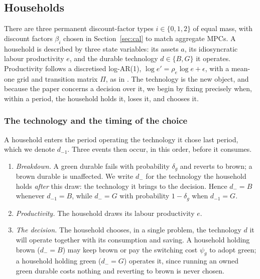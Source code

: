 \subsection{Households}\label{sec:hh}

There are three permanent discount-factor types $i\in\{0,1,2\}$ of equal mass, with
discount factors $\beta_i$ chosen in Section~\ref{sec:cal} to match aggregate MPCs.
A household is described by three state variables: its assets $a$, its idiosyncratic
labour productivity $e$, and the durable technology $d\in\{B, G\}$ it operates.
Productivity follows a discretised log-AR(1), $\log e'=\rho_e\log e+\epsilon$, with a
mean-one grid and transition matrix $\Pi$, as in \citet{ARS2024}. The technology is
the new object, and because the paper concerns a decision over it, we begin by fixing
precisely when, within a period, the household holds it, loses it, and chooses it.

\subsubsection{The technology and the timing of the choice}\label{sec:tech}

A household enters the period operating the technology it chose last period, which we
denote $d_{-1}$. Three events then occur, in this order, before it consumes.

\begin{enumerate}
\item \emph{Breakdown.} A green durable fails with probability $\delta_g$ and reverts
to brown; a brown durable is unaffected. We write $d_-$ for the technology the
household holds \emph{after} this draw: the technology it brings to the decision.
Hence $d_-=B$ whenever $d_{-1}=B$, while $d_-=G$ with probability $1-\delta_g$ when
$d_{-1}=G$.
\item \emph{Productivity.} The household draws its labour productivity $e$.
\item \emph{The decision.} The household chooses, in a single problem, the
technology $d$ it will operate together with its consumption and saving. A household
holding brown ($d_-=B$) may keep brown or pay the switching cost $\psi_g$ to adopt
green; a household holding green ($d_-=G$) operates it, since running an owned green
durable costs nothing and reverting to brown is never chosen.
\end{enumerate}

